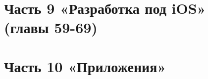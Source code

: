 \documentclass[11pt,a4paper,openany]{book}
\begin{document}
\part*{Часть 9 «Разработка под iOS» (главы 59-69)}











\appendix
\part*{Часть 10 «Приложения»}









\end{document}
